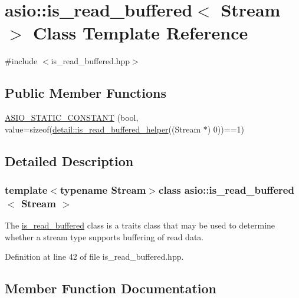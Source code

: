 \hypertarget{classasio_1_1is__read__buffered}{}\section{asio\+:\+:is\+\_\+read\+\_\+buffered$<$ Stream $>$ Class Template Reference}
\label{classasio_1_1is__read__buffered}


{\ttfamily \#include $<$is\+\_\+read\+\_\+buffered.\+hpp$>$}

\subsection*{Public Member Functions}
\begin{DoxyCompactItemize}
\item 
\hyperlink{classasio_1_1is__read__buffered_a4e49db7348f0a0a226a44ea66624496c}{A\+S\+I\+O\+\_\+\+S\+T\+A\+T\+I\+C\+\_\+\+C\+O\+N\+S\+T\+A\+N\+T} (bool, value=sizeof(\hyperlink{namespaceasio_1_1detail_ac51ba8a0b2cbbab69d47430bb1f61b14}{detail\+::is\+\_\+read\+\_\+buffered\+\_\+helper}((Stream $\ast$) 0))==1)
\end{DoxyCompactItemize}


\subsection{Detailed Description}
\subsubsection*{template$<$typename Stream$>$class asio\+::is\+\_\+read\+\_\+buffered$<$ Stream $>$}

The \hyperlink{classasio_1_1is__read__buffered}{is\+\_\+read\+\_\+buffered} class is a traits class that may be used to determine whether a stream type supports buffering of read data. 

Definition at line 42 of file is\+\_\+read\+\_\+buffered.\+hpp.



\subsection{Member Function Documentation}
\hypertarget{classasio_1_1is__read__buffered_a4e49db7348f0a0a226a44ea66624496c}{}
